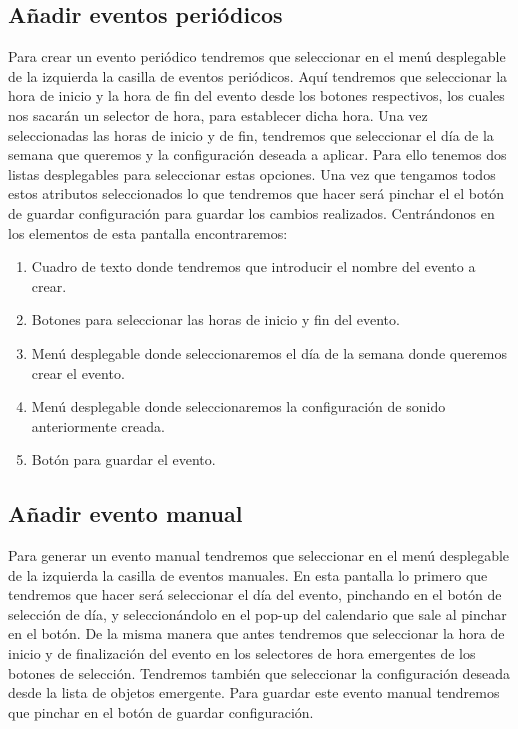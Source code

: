 
\subsection{Añadir eventos periódicos}
Para crear un evento periódico tendremos que seleccionar en el menú desplegable de la izquierda la casilla de eventos periódicos.
Aquí tendremos que seleccionar la hora de inicio y la hora de fin del evento desde los botones respectivos, los cuales nos sacarán un selector de hora, para establecer dicha hora.
Una vez seleccionadas las horas de inicio y de fin, tendremos que seleccionar el día de la semana que queremos y la configuración deseada a aplicar. Para ello tenemos dos listas desplegables para seleccionar estas opciones.
Una vez que tengamos todos estos atributos seleccionados lo que tendremos que hacer será pinchar el el botón de guardar configuración para guardar los cambios realizados.
Centrándonos en los elementos de esta pantalla encontraremos:
\begin{enumerate}
\item Cuadro de texto donde tendremos que introducir el nombre del evento a crear.
\item Botones para seleccionar las horas de inicio y fin del evento.
\item Menú desplegable donde seleccionaremos el día de la semana donde queremos crear el evento.
\item Menú desplegable donde seleccionaremos la configuración de sonido anteriormente creada.
\item Botón para guardar el evento.
\end{enumerate}


\subsection{Añadir evento manual}

Para generar un evento manual tendremos que seleccionar en el menú desplegable de la izquierda la casilla de eventos manuales.
En esta pantalla lo primero que tendremos que hacer será seleccionar el día del evento, pinchando en el botón de selección de día, y seleccionándolo en el pop-up del calendario que sale al pinchar en el botón.
De la misma manera que antes tendremos que seleccionar la hora de inicio y de finalización del evento en los selectores de hora emergentes de los botones de selección.
Tendremos también que seleccionar la configuración deseada desde la lista de objetos emergente.
Para guardar este evento manual tendremos que pinchar en el botón de guardar configuración.

